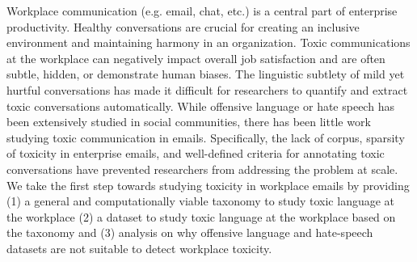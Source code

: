 Workplace communication (e.g. email, chat, etc.) is a central part of enterprise productivity. Healthy conversations are crucial for creating an inclusive environment and maintaining harmony in an organization. Toxic communications at the workplace can negatively impact overall job satisfaction and are often subtle, hidden, or demonstrate human biases. The linguistic subtlety of mild yet hurtful conversations has made it difficult for researchers to quantify and extract toxic conversations automatically. While offensive language or hate speech has been extensively studied in social communities, there has been little work studying toxic communication in emails. Specifically, the lack of corpus, sparsity of toxicity in enterprise emails, and well-defined criteria for annotating toxic conversations have prevented researchers from addressing the problem at scale. We take the first step towards studying toxicity in workplace emails by providing (1) a general and computationally viable taxonomy to study toxic language at the workplace (2) a dataset to study toxic language at the workplace based on the taxonomy and (3) analysis on why offensive language and hate-speech datasets are not suitable to detect workplace toxicity.
